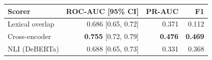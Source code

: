 \begin{tabular}{lrrr}
\toprule
Scorer & ROC-AUC [95\% CI] & PR-AUC & F1 \\
\midrule
Lexical overlap & 0.686 [0.65, 0.72] & 0.371 & 0.112 \\
Cross-encoder & \textbf{0.755} [0.72, 0.79] & \textbf{0.476} & \textbf{0.469} \\
NLI (DeBERTa) & 0.688 [0.65, 0.73] & 0.331 & 0.368 \\
\bottomrule
\end{tabular}
